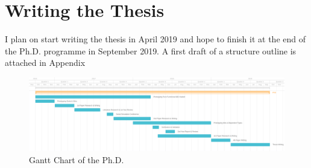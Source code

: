 \section{Writing the Thesis}
I plan on start writing the thesis in April 2019 and hope to finish it at the end of the Ph.D. programme in September 2019. A first draft of a structure outline is attached in Appendix 

\clearpage

\begin{landscape}
	\centering
	
	\begin{figure}
	\centering
	\includegraphics[width=1.5\textwidth, height=0.8\textwidth, angle=0]{./fig/phd_gantt.png}
	\caption{Gantt Chart of the Ph.D.}
	\label{fig:gantt}
\end{figure}
\end{landscape}